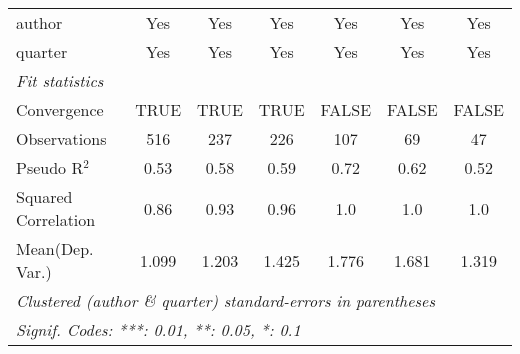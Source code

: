 \begin{tabular}{lcccccc}
   author                                                     & Yes          & Yes     & Yes          & Yes                     & Yes           & Yes\\  
   quarter                                                    & Yes          & Yes     & Yes          & Yes                     & Yes           & Yes\\  
   \midrule
   \emph{Fit statistics}\\
   Convergence                                                &TRUE          & TRUE    & TRUE         & FALSE                   & FALSE         & FALSE\\  
   Observations                                               & 516          & 237     & 226          & 107                     & 69            & 47\\  
   Pseudo R$^2$                                               & 0.53         & 0.58    & 0.59         & 0.72                    & 0.62          & 0.52\\  
   Squared Correlation                                        & 0.86         & 0.93    & 0.96         & 1.0                     & 1.0           & 1.0\\  
Mean(Dep. Var.) & 1.099 & 1.203 & 1.425 & 1.776 & 1.681 & 1.319 \\
   \midrule \midrule
   \multicolumn{7}{l}{\emph{Clustered (author \& quarter) standard-errors in parentheses}}\\
   \multicolumn{7}{l}{\emph{Signif. Codes: ***: 0.01, **: 0.05, *: 0.1}}\\
\end{tabular}
\par\endgroup
